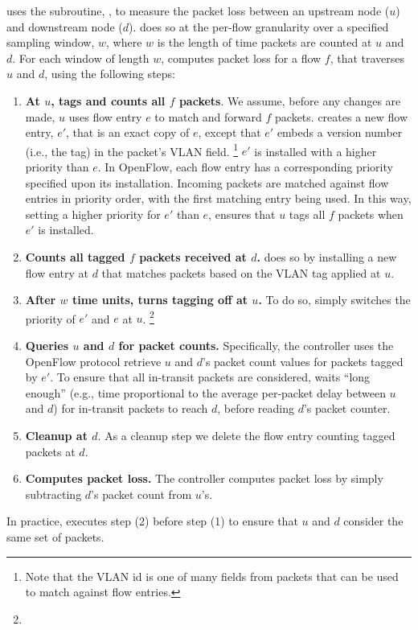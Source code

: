 \fl uses the subroutine, \pcnts, to measure the packet loss between an upstream node ($u$) and downstream node ($d$).  \pcnt does so at the per-flow granularity over a specified sampling window, $w$, 
where $w$ is the length of time packets are counted at $u$ and $d$. For each window of length $w$, \pcnt computes packet loss for a flow $f$, that traverses $u$ and $d$, using the following steps:
\begin{enumerate}
	\item 
	\textbf{At $u$, tags and counts all $f$ packets}.  
	We assume, before any changes are made, $u$ uses flow entry $e$ to match and forward $f$ packets.
	\pcnt creates a new flow entry, $e'$, that is an exact copy of $e$, except that $e'$ embeds a version number (i.e., the tag) in the packet's VLAN field.  
	\footnote{Note that the VLAN id is one of many fields from packets that can be used to match against flow entries. }
	$e'$ is installed with a higher priority than $e$.  In OpenFlow, each flow entry has a corresponding priority specified upon its installation.
	Incoming packets are matched against flow entries in priority order, with the first matching entry being used. 
	In this way, setting a higher priority for $e'$ than $e$, ensures that $u$ tags all $f$ packets when $e'$ is installed.

	\item
	\textbf{Counts all tagged $f$ packets received at $d$.} \pcnt does so by installing a new flow entry at $d$ that matches packets based on the VLAN tag applied at $u$.  

	\item 
	\textbf{After $w$ time units, turns tagging off at $u$.} To do so, \pcnt simply switches the priority of $e'$ and $e$ at $u$. 
	\footnote{}

	\item
	\textbf{Queries $u$ and $d$ for packet counts.} 
	Specifically, the controller uses the OpenFlow protocol retrieve $u$ and $d$'s packet count values for packets tagged by $e'$.
	To ensure that all in-transit packets are considered, \pcnt waits ``long enough'' (e.g., time proportional to the average per-packet delay between $u$ and $d$) for in-transit packets to reach $d$, before reading $d$'s packet counter. 

	\item
	\textbf{Cleanup at $d$}.
	As a cleanup step we delete the flow entry counting tagged packets at $d$.

	\item 
	\textbf{Computes packet loss.}
	The controller computes packet loss by simply subtracting $d$'s packet count from $u$'s. 

\end{enumerate}
In practice, \pcnt executes step (2) before step (1) to ensure that $u$ and $d$ consider the same set of packets.

